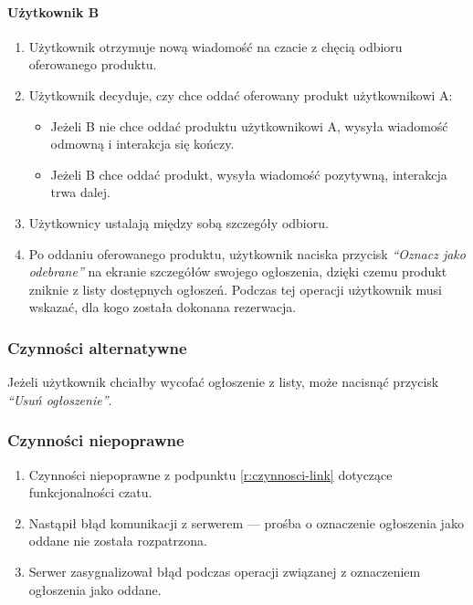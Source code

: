 \documentclass[licencjacka]{pracamgr}
\begin{document}
    \paragraph{Użytkownik B}
    \begin{enumerate}
        \item Użytkownik otrzymuje nową wiadomość na czacie z chęcią odbioru oferowanego produktu.
        \item Użytkownik decyduje, czy chce oddać oferowany produkt użytkownikowi A\@:
        \begin{itemize}
            \item Jeżeli B nie chce oddać produktu użytkownikowi A, wysyła wiadomość odmowną i interakcja się kończy.
            \item Jeżeli B chce oddać produkt, wysyła wiadomość pozytywną, interakcja trwa dalej.
        \end{itemize}
        \item Użytkownicy ustalają między sobą szczegóły odbioru.
        \item Po oddaniu oferowanego produktu, użytkownik naciska przycisk \textit{``Oznacz jako odebrane''} na ekranie szczegółów swojego ogłoszenia, dzięki czemu produkt zniknie z listy dostępnych ogłoszeń. Podczas tej operacji użytkownik musi wskazać, dla kogo została dokonana rezerwacja.
    \end{enumerate}
    \subsubsection{Czynności alternatywne}
    Jeżeli użytkownik chciałby wycofać ogłoszenie z listy, może nacisnąć przycisk \textit{``Usuń ogłoszenie''}.
    \subsubsection{Czynności niepoprawne}
    \begin{enumerate}
        \item Czynności niepoprawne z podpunktu \ref{r:czynnosci-link} dotyczące funkcjonalności czatu.
        \item Nastąpił błąd komunikacji z serwerem --- prośba o oznaczenie ogłoszenia jako oddane nie została rozpatrzona.
        \item Serwer zasygnalizował błąd podczas operacji związanej z oznaczeniem ogłoszenia jako oddane.
    \end{enumerate}
\end{document}
